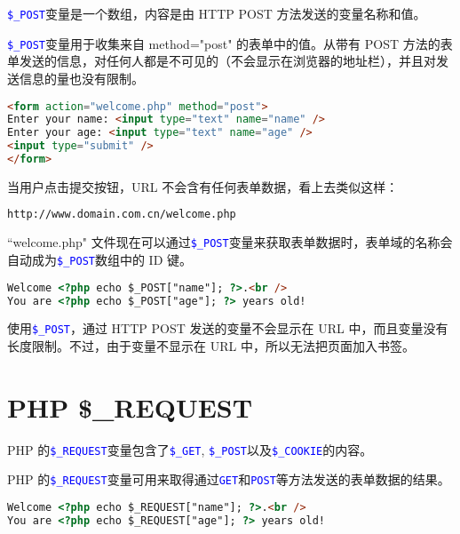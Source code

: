 \textcolor{Blue}{\texttt{\$\_POST}}变量是一个数组，内容是由 HTTP POST 方法发送的变量名称和值。



\textcolor{Blue}{\texttt{\$\_POST}}变量用于收集来自 method="post" 的表单中的值。从带有 POST 方法的表单发送的信息，对任何人都是不可见的（不会显示在浏览器的地址栏），并且对发送信息的量也没有限制。

\begin{lstlisting}[language=HTML]
<form action="welcome.php" method="post">
Enter your name: <input type="text" name="name" />
Enter your age: <input type="text" name="age" />
<input type="submit" />
</form>
\end{lstlisting}

当用户点击提交按钮，URL 不会含有任何表单数据，看上去类似这样：


\begin{lstlisting}[language=bash]
http://www.domain.com.cn/welcome.php
\end{lstlisting}

``welcome.php" 文件现在可以通过\textcolor{Blue}{\texttt{\$\_POST}}变量来获取表单数据时，表单域的名称会自动成为\textcolor{Blue}{\texttt{\$\_POST}}数组中的 ID 键。

\begin{lstlisting}[language=HTML]
Welcome <?php echo $_POST["name"]; ?>.<br />
You are <?php echo $_POST["age"]; ?> years old!
\end{lstlisting}


使用\textcolor{Blue}{\texttt{\$\_POST}}，通过 HTTP POST 发送的变量不会显示在 URL 中，而且变量没有长度限制。不过，由于变量不显示在 URL 中，所以无法把页面加入书签。







\chapter{PHP \$\_REQUEST}


PHP 的\textcolor{Blue}{\texttt{\$\_REQUEST}}变量包含了\textcolor{Blue}{\texttt{\$\_GET}}, \textcolor{Blue}{\texttt{\$\_POST}}以及\textcolor{Blue}{\texttt{\$\_COOKIE}}的内容。

PHP 的\textcolor{Blue}{\texttt{\$\_REQUEST}}变量可用来取得通过\textcolor{Blue}{\texttt{GET}}和\textcolor{Blue}{\texttt{POST}}等方法发送的表单数据的结果。



\begin{lstlisting}[language=HTML]
Welcome <?php echo $_REQUEST["name"]; ?>.<br />
You are <?php echo $_REQUEST["age"]; ?> years old!
\end{lstlisting}


